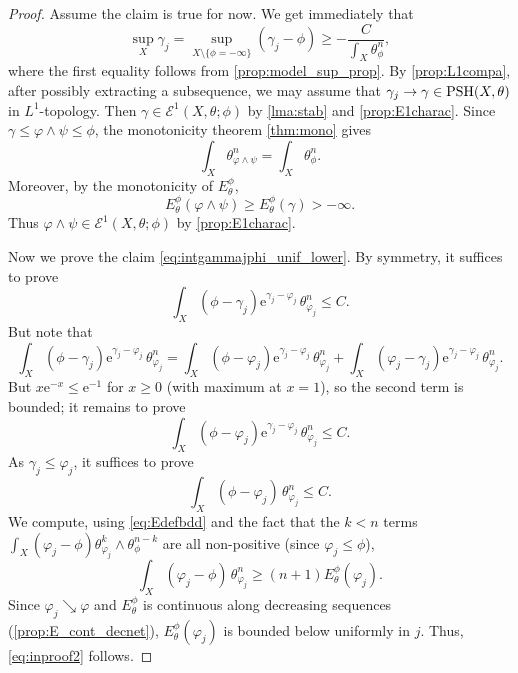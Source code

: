\begin{proof}
	Assume the claim is true for now.
	We get immediately that
    \[
    \sup_{X}\gamma_j=\sup_{X\setminus \{\phi=-\infty\}}(\gamma_j-\phi)\geq -\frac{C}{\int_X \theta_{\phi}^n},
    \]
    where the first equality follows from \cref{prop:model_sup_prop}.
    By \cref{prop:L1compa}, after possibly extracting a subsequence, we may assume that $\gamma_j\to \gamma\in \mathrm{PSH}(X,\theta)$ in $L^1$-topology.
    Then $\gamma\in \mathcal{E}^1(X,\theta;\phi)$ by \cref{lma:stab} and \cref{prop:E1charac}. Since $\gamma\leq\varphi\land\psi\leq\phi$, the monotonicity theorem \cref{thm:mono} gives
    \[
        \int_X\theta_{\varphi\land\psi}^n=\int_X\theta_\phi^n.
    \]
    Moreover, by the monotonicity of $E^\phi_\theta$,
    \[
        E^\phi_\theta(\varphi\land\psi)\geq E^\phi_\theta(\gamma)>-\infty.
    \]
    Thus $\varphi\land\psi\in\mathcal E^1(X,\theta;\phi)$ by \cref{prop:E1charac}.


	Now we prove the claim \eqref{eq:intgammajphi_unif_lower}.
	By symmetry, it suffices to prove
	\[
	\int_X (\phi-\gamma_j) \mathrm{e}^{\gamma_j-\varphi_j}\,\theta_{\varphi_j}^n\leq C.
	\]
	But note that
	\[
	\int_X (\phi-\gamma_j) \mathrm{e}^{\gamma_j-\varphi_j}\,\theta_{\varphi_j}^n=\int_X (\phi-\varphi_j) \mathrm{e}^{\gamma_j-\varphi_j}\,\theta_{\varphi_j}^n+\int_X (\varphi_j-\gamma_j) \mathrm{e}^{\gamma_j-\varphi_j}\,\theta_{\varphi_j}^n.
	\]
	But $x \mathrm{e}^{-x}\leq \mathrm{e}^{-1}$ for $x\geq 0$ (with maximum at $x=1$), so the second term is bounded; it remains to prove
	\[
	\int_X (\phi-\varphi_j) \mathrm{e}^{\gamma_j-\varphi_j}\,\theta_{\varphi_j}^n\leq C.
	\]
	As $\gamma_j\leq \varphi_j$, it suffices to prove
	\begin{equation}\label{eq:inproof2}
		\int_X (\phi-\varphi_j)\,\theta_{\varphi_j}^n\leq C.
	\end{equation}
    We compute, using \eqref{eq:Edefbdd} and the fact that the $k<n$ terms
    $\int_X(\varphi_j-\phi)\theta_{\varphi_j}^k\wedge\theta_\phi^{n-k}$ are all non-positive (since $\varphi_j\leq \phi$),
    \[
        \int_X (\varphi_j-\phi)\,\theta_{\varphi_j}^n\geq (n+1)E_{\theta}^{\phi}(\varphi_j).
    \]
	Since $\varphi_j\searrow\varphi$ and $E_\theta^{\phi}$ is continuous along decreasing sequences (\cref{prop:E_cont_decnet}), $E_\theta^{\phi}(\varphi_j)$ is bounded below uniformly in $j$. Thus, \eqref{eq:inproof2} follows.
\end{proof}



